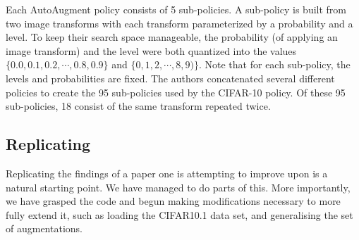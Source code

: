 \documentclass[10pt,twocolumn,letterpaper]{article}
\begin{document}
	
	

	Each AutoAugment policy consists of 5 sub-policies. A sub-policy is built from two image transforms with each transform parameterized by a probability and a level. To keep their search space manageable, the probability (of applying an image transform) and the level were both quantized into the values $\{ 0.0, 0.1, 0.2, \cdots, 0.8, 0.9\}$ and $\{0, 1, 2, \cdots, 8, 9)\}$. Note that for each sub-policy, the levels and probabilities are fixed. The authors concatenated several different policies to create the 95 sub-policies used by the CIFAR-10 policy. Of these 95 sub-policies, 18 consist of the same transform repeated twice.

\subsection{Replicating \cite{Cubuk2018}}
Replicating the findings of a paper one is attempting to improve upon is a natural starting point. We have managed to do parts of this. More importantly, we have grasped the code and begun making modifications necessary to more fully extend it, such as loading the CIFAR10.1 data set, and generalising the set of augmentations.

\end{document}
